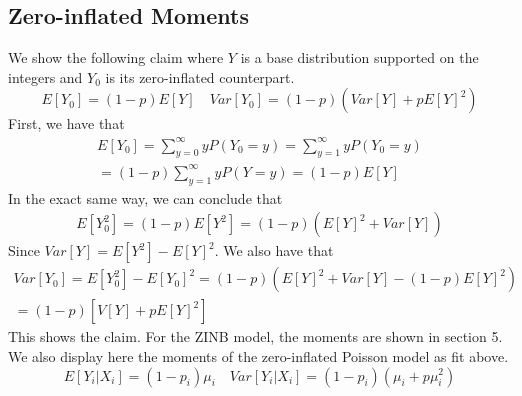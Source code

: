 \documentclass[12pt, titlepage]{article}
\begin{document}
	\subsection*{Zero-inflated Moments}
	We show the following claim where $Y$ is a base distribution supported on the integers and $Y_0$ is its zero-inflated counterpart.
	$$
	E[Y_0] = (1-p)E[Y] \quad Var[Y_0] = (1-p)(Var[Y] + pE[Y]^2)
	$$
	First, we have that
	\begin{gather*}
		E[Y_0] = \sum_{y=0}^{\infty} yP(Y_0 = y) = \sum_{y=1}^{\infty} yP(Y_0 = y) \\
		= (1-p)\sum_{y=1}^{\infty}yP(Y=y) = (1-p)E[Y]
	\end{gather*}
	In the exact same way, we can conclude that
	\begin{gather*}
		E[Y_0^2] = (1-p)E[Y^2] = (1-p)(E[Y]^2 + Var[Y])
	\end{gather*}
	Since $Var[Y] = E[Y^2] - E[Y]^2$. We also have that
	\begin{gather*}
		Var[Y_0] = E[Y_0^2] - E[Y_0]^2 = (1-p)(E[Y]^2 + Var[Y] - (1-p)E[Y]^2) \\
		= (1-p)[V[Y] + pE[Y]^2]
	\end{gather*}
	This shows the claim. For the ZINB model, the moments are shown in section 5. We also display here the moments of the zero-inflated Poisson model as fit above. 
	$$
	E[Y_i|X_i] = (1-p_i)\mu_i \quad  Var[Y_i|X_i] = (1-p_i)(\mu_i + p\mu_i^2)
	$$
\end{document}
